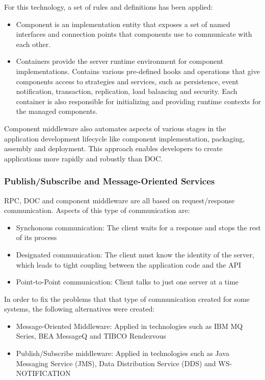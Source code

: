     For this technology, a set of rules and definitions has been applied:
    \begin{itemize}
        \item Component is an implementation entity that exposes a set of named interfaces and connection points
        that components use to communicate with each other.
        \item Containers provide the server runtime environment for component implementations. Contains various
        pre-defined hooks and operations that give components access to strategies and services, such as persistence,
        event notification, transaction, replication, load balancing and security. Each container is also responsible
        for initializing and providing runtime contexts for the managed components.
    \end{itemize}

    Component middleware also automates aspects of various stages in the application development lifecycle like
    component implementation, packaging, assembly and deployment. This approach enables developers
    to create applications more rapidly and robustly than DOC.

    \subsubsection{Publish/Subscribe and Message-Oriented Services}
    RPC, DOC and component middleware are all based on request/response communication. Aspects of this type
    of communication are:
    \begin{itemize}
        \item Synchonous communication: The client waits for a response and stops the rest
        of its process
        \item Designated communication: The client must know the identity
        of the server, which leads to tight coupling between the application code and the API
        \item Point-to-Point communication: Client talks to just one server at a time
    \end{itemize}

    In order to fix the problems that that type of communication created for some systems,
    the following alternatives were created:
    \begin{itemize}
        \item Message-Oriented Middleware: Applied in technologies such as IBM MQ Series, BEA
        MessageQ and TIBCO Rendezvous
        \item Publish/Subscribe middleware: Applied in technologies such as Java Messaging Service
        (JMS), Data Distribution Service (DDS) and WS-NOTIFICATION
    \end{itemize}

